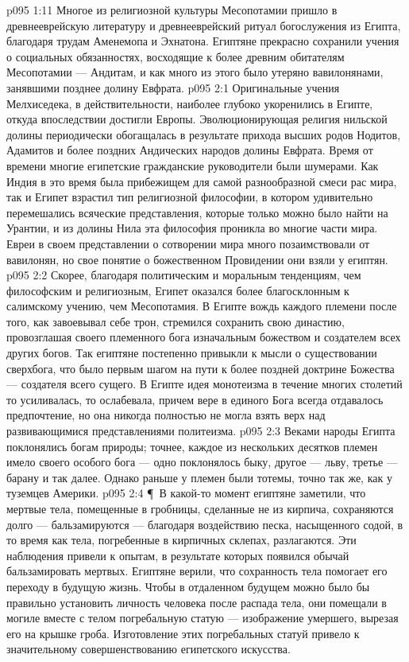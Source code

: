 \vs p095 1:11 Многое из религиозной культуры Месопотамии пришло в древнееврейскую литературу и древнееврейский ритуал богослужения из Египта, благодаря трудам Аменемопа и Эхнатона. Египтяне прекрасно сохранили учения о социальных обязанностях, восходящие к более древним обитателям Месопотамии --- Андитам, и как много из этого было утеряно вавилонянами, занявшими позднее долину Евфрата.
\vs p095 2:1 Оригинальные учения Мелхиседека, в действительности, наиболее глубоко укоренились в Египте, откуда впоследствии достигли Европы. Эволюционирующая религия нильской долины периодически обогащалась в результате прихода высших родов Нодитов, Адамитов и более поздних Андических народов долины Евфрата. Время от времени многие египетские гражданские руководители были шумерами. Как Индия в это время была прибежищем для самой разнообразной смеси рас мира, так и Египет взрастил тип религиозной философии, в котором удивительно перемешались всяческие представления, которые только можно было найти на Урантии, и из долины Нила эта философия проникла во многие части мира. Евреи в своем представлении о сотворении мира много позаимствовали от вавилонян, но свое понятие о божественном Провидении они взяли у египтян.
\vs p095 2:2 Скорее, благодаря политическим и моральным тенденциям, чем философским и религиозным, Египет оказался более благосклонным к салимскому учению, чем Месопотамия. В Египте вождь каждого племени после того, как завоевывал себе трон, стремился сохранить свою династию, провозглашая своего племенного бога изначальным божеством и создателем всех других богов. Так египтяне постепенно привыкли к мысли о существовании сверхбога, что было первым шагом на пути к более поздней доктрине Божества --- создателя всего сущего. В Египте идея монотеизма в течение многих столетий то усиливалась, то ослабевала, причем вере в единого Бога всегда отдавалось предпочтение, но она никогда полностью не могла взять верх над развивающимися представлениями политеизма.
\vs p095 2:3 Веками народы Египта поклонялись богам природы; точнее, каждое из нескольких десятков племен имело своего особого бога --- одно поклонялось быку, другое --- льву, третье --- барану и так далее. Однако раньше у племен были тотемы, точно так же, как у туземцев Америки.
\vs p095 2:4 \P\ В какой\hyp{}то момент египтяне заметили, что мертвые тела, помещенные в гробницы, сделанные не из кирпича, сохраняются долго --- бальзамируются --- благодаря воздействию песка, насыщенного содой, в то время как тела, погребенные в кирпичных склепах, разлагаются. Эти наблюдения привели к опытам, в результате которых появился обычай бальзамировать мертвых. Египтяне верили, что сохранность тела помогает его переходу в будущую жизнь. Чтобы в отдаленном будущем можно было бы правильно установить личность человека после распада тела, они помещали в могиле вместе с телом погребальную статую --- изображение умершего, вырезая его на крышке гроба. Изготовление этих погребальных статуй привело к значительному совершенствованию египетского искусства.
